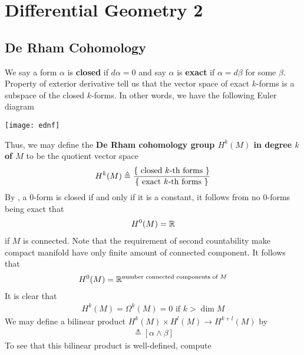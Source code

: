 \documentclass{report}
\begin{document}
\chapter{Differential Geometry 2}
\section{De Rham Cohomology}
\begin{abstract}

\end{abstract}
\begin{mdframed}
We say a form $\alpha $ is \textbf{closed} if $d\alpha =0$ and say $\alpha $ is  \textbf{exact} if $\alpha=d\beta $ for some $\beta $. Property of exterior derivative tell us that the vector space of exact $k$-forms is a subspace of the closed $k$-forms. In other words, we have the following Euler diagram 
\begin{center}
   \begin{minipage}{0.9\linewidth}  
       \centering
\texttt{[image: ednf]}
   \end{minipage}
\end{center}
Thus, we may define the \textbf{De Rham cohomology group $H^k(M)$ in degree $k$ of  $M$} to be the quotient vector space 
\begin{align*}
H^k(M)\triangleq \frac{\{ \text{ closed $k$-th forms } \}}{\{ \text{ exact $k$-th forms } \}}
\end{align*}
By , a 0-form is closed if and only if it is a constant, it follows from no 0-forms being exact that 
\begin{align*}
H^0(M)= \mathbb{R}
\end{align*}
if $M$ is connected. Note that the requirement of second countability make compact manifold have only finite amount of connected component. It follows that 
\begin{align*}
H^0(M)=\mathbb{R}^{\text{number  connected components of }M}
\end{align*}
It is clear that 
\begin{align*}
H^k(M)=\Omega^k(M)=0\text{ if }k>\operatorname{dim}M
\end{align*}
We may define a bilinear product $H^k(M)\times H^l(M)\to H^{k+l}(M)$ by 
\begin{align*}
[\alpha ][\beta ]\triangleq  [\alpha \wedge  \beta ]
\end{align*}
To see that this bilinear product is well-defined, compute 
\begin{align*}

\end{align*}
\end{mdframed}
\end{document}
